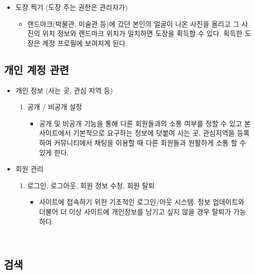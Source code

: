 \begin{itemize}
    \item 도장 찍기 (도장 주는 권한은 관리자가)
    \begin{itemize}
        \item [] 랜드마크(박물관, 미술관 등)에 갔던 본인의 얼굴이 나온 사진을 올리고 그 사진의 위치 정보와 랜드마크 위치가 일치하면 도장을 획득할 수 있다. 획득한 도장은 계정 프로필에 보여지게 된다.
    \end{itemize}
\end{itemize}

\subsection{개인 계정 관련}

\begin{itemize}
    \item 개인 정보 (사는 곳, 관심 지역 등) 
    \begin{enumerate}
        \item 공개 / 비공개 설정
        \begin{itemize}
            \item[] 공개 및 비공개 기능을 통해 다른 회원들과의 소통 여부를 정할 수 있고 본 사이트에서 기본적으로 요구하는 정보에 덧붙여 사는 곳, 관심지역을 등록하여 커뮤니티에서 채팅을 이용할 때 다른 회원들과 원활하게 소통 할 수 있게 한다.
        \end{itemize}
    \end{enumerate}
\end{itemize}

\begin{itemize}
    \item 회원 관리
    \begin{enumerate}
        \item 로그인, 로그아웃, 회원 정보 수정, 회원 탈퇴
        \begin{itemize}
            \item[] 사이트에 접속하기 위한 기초적인 로그인/아웃 시스템. 정보 업데이트와 더불어 더 이상 사이트에 개인정보를 남기고 싶지 않을 경우 탈퇴가 가능하다.
        \end{itemize}
    \end{enumerate}
\end{itemize}
\par\

\subsection{검색}

